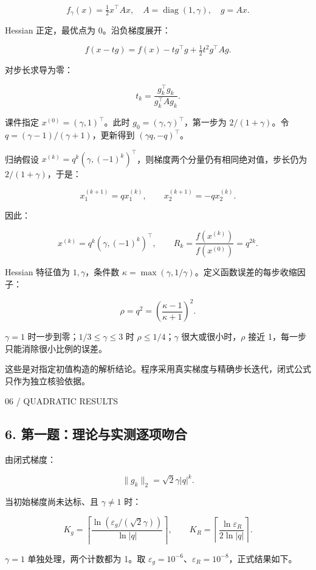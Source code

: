 \documentclass[10pt,a4paper]{article}
\newcommand{\eyebrow}[1]{{\sffamily\fontsize{8.3}{12}\selectfont\color{navy}#1}\par\vspace{4pt}{\color{navy}\hrule height 1pt}\vspace{12pt}}
\begin{document}
\[f_\gamma(x)=\tfrac12x^\top Ax,\quad A=\operatorname{diag}(1,\gamma),\quad g=Ax.\]

Hessian 正定，最优点为 \(0\)。沿负梯度展开：

\[f(x-tg)=f(x)-t g^\top g+\tfrac12t^2g^\top Ag.\]

对步长求导为零：

\[\boxed{t_k=\frac{g_k^\top g_k}{g_k^\top Ag_k}.}\]

课件指定 \(x^{(0)}=(\gamma,1)^\top\)。此时
\(g_0=(\gamma,\gamma)^\top\)，第一步为 \(2/(1+\gamma)\)。令
\(q=(\gamma-1)/(\gamma+1)\)，更新得到 \((\gamma q,-q)^\top\)。

归纳假设
\(x^{(k)}=q^k(\gamma,(-1)^k)^\top\)，则梯度两个分量仍有相同绝对值，步长仍为
\(2/(1+\gamma)\)，于是：

\[x_1^{(k+1)}=q x_1^{(k)},\qquad x_2^{(k+1)}=-q x_2^{(k)}.\]

因此：

\[\boxed{x^{(k)}=q^k(\gamma,(-1)^k)^\top,\qquad
R_k=\frac{f(x^{(k)})}{f(x^{(0)})}=q^{2k}.}\]

Hessian 特征值为 \(1,\gamma\)，条件数
\(\kappa=\max(\gamma,1/\gamma)\)。定义函数误差的每步收缩因子：

\[\boxed{\rho=q^2=\left(\frac{\kappa-1}{\kappa+1}\right)^2.}\]

\(\gamma=1\) 时一步到零；\(1/3\le\gamma\le3\) 时
\(\rho\le1/4\)；\(\gamma\) 很大或很小时，\(\rho\) 接近
1，每一步只能消除很小比例的误差。

这些是对指定初值构造的解析结论。程序采用真实梯度与精确步长迭代，闭式公式只作为独立核验依据。

\clearpage

\eyebrow{06 / QUADRATIC RESULTS}

\subsection{6.
第一题：理论与实测逐项吻合}\label{ux7b2cux4e00ux9898ux7406ux8bbaux4e0eux5b9eux6d4bux9010ux9879ux543bux5408}

由闭式梯度：

\[\|g_k\|_2=\sqrt2\gamma |q|^k.\]

当初始梯度尚未达标、且 \(\gamma\ne1\) 时：

\[K_g=\left\lceil\frac{\ln(\varepsilon_g/(\sqrt2\gamma))}{\ln|q|}\right\rceil,
\qquad
K_R=\left\lceil\frac{\ln\varepsilon_R}{2\ln|q|}\right\rceil.\]

\(\gamma=1\) 单独处理，两个计数都为 1。取
\(\varepsilon_g=10^{-6}\)、\(\varepsilon_R=10^{-8}\)，正式结果如下。
\end{document}
